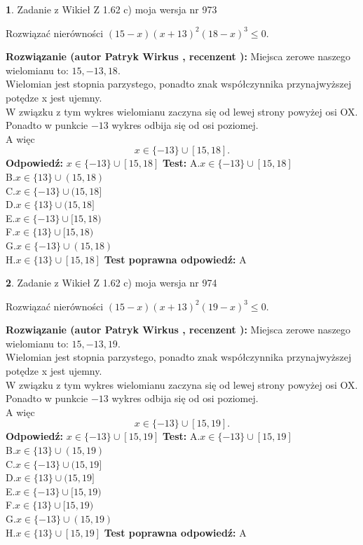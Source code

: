 \documentclass[12pt, a4paper]{article}
\theoremstyle{definition} %
\newtheorem{zad}{}
\newcommand{\zadStart}[1]{\begin{zad}#1\newline}
\newcommand{\zadStop}{\end{zad}}
\newcommand{\rozwStart}[2]{\noindent \textbf{Rozwiązanie (autor #1 , recenzent #2): }\newline}
\newcommand{\rozwStop}{\newline}
\newcommand{\odpStart}{\noindent \textbf{Odpowiedź:}\newline}
\newcommand{\odpStop}{\newline}
\newcommand{\testStart}{\noindent \textbf{Test:}\newline}
\newcommand{\testStop}{\newline}
\newcommand{\kluczStart}{\noindent \textbf{Test poprawna odpowiedź:}\newline}
\newcommand{\kluczStop}{\newline}
\begin{document}
\zadStart{Zadanie z Wikieł Z 1.62 c) moja wersja nr 973}

Rozwiązać nierówności $(15-x)(x+13)^{2}(18-x)^{3}\le0$.
\zadStop
\rozwStart{Patryk Wirkus}{}
Miejsca zerowe naszego wielomianu to: $15, -13, 18$.\\
Wielomian jest stopnia parzystego, ponadto znak współczynnika przy\linebreak najwyższej potędze x jest ujemny.\\ W związku z tym wykres wielomianu zaczyna się od lewej strony powyżej osi OX.\\
Ponadto w punkcie $-13$ wykres odbija się od osi poziomej.\\
A więc $$x \in \{-13\} \cup [15,18].$$
\rozwStop
\odpStart
$x \in \{-13\} \cup [15,18]$
\odpStop
\testStart
A.$x \in \{-13\} \cup [15,18]$\\
B.$x \in \{13\} \cup (15,18)$\\
C.$x \in \{-13\} \cup (15,18]$\\
D.$x \in \{13\} \cup (15,18]$\\
E.$x \in \{-13\} \cup [15,18)$\\
F.$x \in \{13\} \cup [15,18)$\\
G.$x \in \{-13\} \cup (15,18)$\\
H.$x \in \{13\} \cup [15,18]$
\testStop
\kluczStart
A
\kluczStop



\zadStart{Zadanie z Wikieł Z 1.62 c) moja wersja nr 974}

Rozwiązać nierówności $(15-x)(x+13)^{2}(19-x)^{3}\le0$.
\zadStop
\rozwStart{Patryk Wirkus}{}
Miejsca zerowe naszego wielomianu to: $15, -13, 19$.\\
Wielomian jest stopnia parzystego, ponadto znak współczynnika przy\linebreak najwyższej potędze x jest ujemny.\\ W związku z tym wykres wielomianu zaczyna się od lewej strony powyżej osi OX.\\
Ponadto w punkcie $-13$ wykres odbija się od osi poziomej.\\
A więc $$x \in \{-13\} \cup [15,19].$$
\rozwStop
\odpStart
$x \in \{-13\} \cup [15,19]$
\odpStop
\testStart
A.$x \in \{-13\} \cup [15,19]$\\
B.$x \in \{13\} \cup (15,19)$\\
C.$x \in \{-13\} \cup (15,19]$\\
D.$x \in \{13\} \cup (15,19]$\\
E.$x \in \{-13\} \cup [15,19)$\\
F.$x \in \{13\} \cup [15,19)$\\
G.$x \in \{-13\} \cup (15,19)$\\
H.$x \in \{13\} \cup [15,19]$
\testStop
\kluczStart
A
\kluczStop
\end{document}
